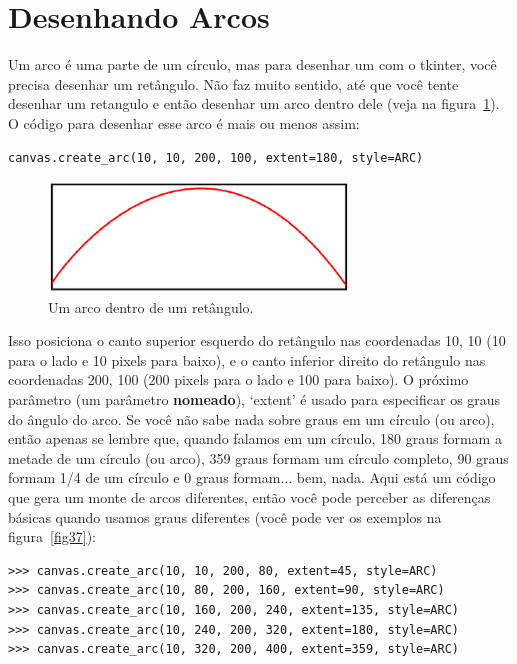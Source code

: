 \section{Desenhando Arcos}

Um arco é uma parte de um círculo, mas para desenhar um com o tkinter, você precisa desenhar um retângulo. Não faz muito sentido, até que você tente desenhar um retangulo e então desenhar um arco dentro dele (veja na figura~\ref{fig36}). O código para desenhar esse arco é mais ou menos assim:

\begin{listing}
\begin{verbatim}
canvas.create_arc(10, 10, 200, 100, extent=180, style=ARC)
\end{verbatim}
\end{listing}

\begin{figure}
\begin{center}
\includegraphics[width=80mm]{eps/figure36.eps}
\end{center}
\caption{Um arco dentro de um retângulo.}\label{fig36}
\end{figure}

Isso posiciona o canto superior esquerdo do retângulo nas coordenadas 10, 10 (10 para o lado e 10 pixels para baixo), e o canto inferior direito do retângulo nas coordenadas 200, 100 (200 pixels para o lado e 100 para baixo). O próximo parâmetro (um parâmetro \textbf{nomeado}), `extent' é usado para especificar os graus do ângulo do arco. Se você não sabe nada sobre graus em um círculo (ou arco), então apenas se lembre que, quando falamos em um círculo, 180 graus formam a metade de um círculo (ou arco), 359 graus formam um círculo completo, 90 graus formam 1/4 de um círculo e 0 graus formam$\ldots$ bem, nada. Aqui está um código que gera um monte de arcos diferentes, então você pode perceber as diferenças básicas quando usamos graus diferentes (você pode ver os exemplos na figura~\ref{fig37}):

\begin{listing}
\begin{verbatim}
>>> canvas.create_arc(10, 10, 200, 80, extent=45, style=ARC)
>>> canvas.create_arc(10, 80, 200, 160, extent=90, style=ARC)
>>> canvas.create_arc(10, 160, 200, 240, extent=135, style=ARC)
>>> canvas.create_arc(10, 240, 200, 320, extent=180, style=ARC)
>>> canvas.create_arc(10, 320, 200, 400, extent=359, style=ARC)
\end{verbatim}
\end{listing}

